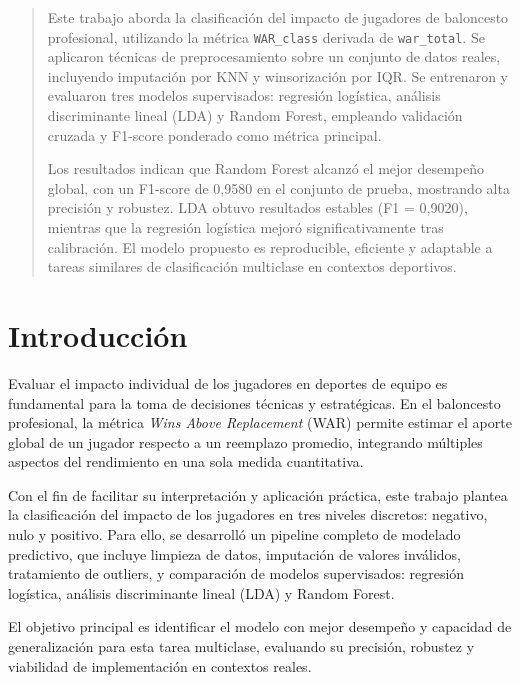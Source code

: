 \begin{multicols}{2}
    

\begin{abstract}
Este trabajo aborda la clasificación del impacto de jugadores de baloncesto profesional, utilizando la métrica \texttt{WAR\_class} derivada de \texttt{war\_total}. Se aplicaron técnicas de preprocesamiento sobre un conjunto de datos reales, incluyendo imputación por KNN y winsorización por IQR. Se entrenaron y evaluaron tres modelos supervisados: regresión logística, análisis discriminante lineal (LDA) y Random Forest, empleando validación cruzada y F1-score ponderado como métrica principal.

Los resultados indican que Random Forest alcanzó el mejor desempeño global, con un F1-score de 0,9580 en el conjunto de prueba, mostrando alta precisión y robustez. LDA obtuvo resultados estables (F1 = 0,9020), mientras que la regresión logística mejoró significativamente tras calibración. El modelo propuesto es reproducible, eficiente y adaptable a tareas similares de clasificación multiclase en contextos deportivos.
\end{abstract}


\section{Introducción}

Evaluar el impacto individual de los jugadores en deportes de equipo es fundamental para la toma de decisiones técnicas y estratégicas. En el baloncesto profesional, la métrica \textit{Wins Above Replacement} (WAR) permite estimar el aporte global de un jugador respecto a un reemplazo promedio, integrando múltiples aspectos del rendimiento en una sola medida cuantitativa.

Con el fin de facilitar su interpretación y aplicación práctica, este trabajo plantea la clasificación del impacto de los jugadores en tres niveles discretos: negativo, nulo y positivo. Para ello, se desarrolló un pipeline completo de modelado predictivo, que incluye limpieza de datos, imputación de valores inválidos, tratamiento de outliers, y comparación de modelos supervisados: regresión logística, análisis discriminante lineal (LDA) y Random Forest.

El objetivo principal es identificar el modelo con mejor desempeño y capacidad de generalización para esta tarea multiclase, evaluando su precisión, robustez y viabilidad de implementación en contextos reales.





\end{multicols}
